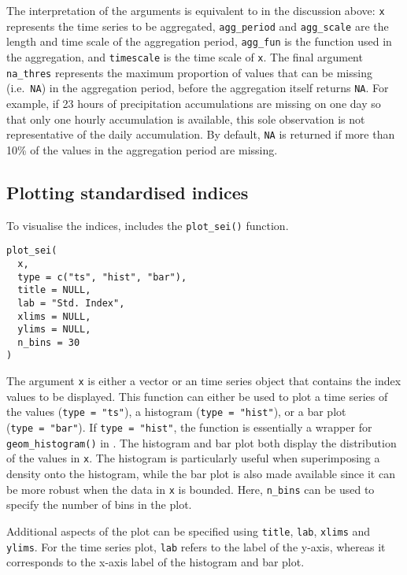 The interpretation of the arguments is equivalent to in the discussion above: \texttt{x} represents the  time series to be aggregated, \texttt{agg\_period} and \texttt{agg\_scale} are the length and time scale of the aggregation period, \texttt{agg\_fun} is the function used in the aggregation, and \texttt{timescale} is the time scale of \texttt{x}. The final argument \texttt{na\_thres} represents the maximum proportion of values that can be missing (i.e.~\texttt{NA}) in the aggregation period, before the aggregation itself returns \texttt{NA}. For example, if 23 hours of precipitation accumulations are missing on one day so that only one hourly accumulation is available, this sole observation is not representative of the daily accumulation. By default, \texttt{NA} is returned if more than 10\% of the values in the aggregation period are missing.

\subsection{Plotting standardised indices}\label{plotting-standardised-indices}

To visualise the indices,  includes the \texttt{plot\_sei()} function.

\begin{verbatim}
plot_sei(
  x,
  type = c("ts", "hist", "bar"),
  title = NULL,
  lab = "Std. Index",
  xlims = NULL,
  ylims = NULL,
  n_bins = 30
)
\end{verbatim}

The argument \texttt{x} is either a vector or an  time series object that contains the index values to be displayed. This function can either be used to plot a time series of the values (\texttt{type\ =\ "ts"}), a histogram (\texttt{type\ =\ "hist"}), or a bar plot (\texttt{type\ =\ "bar"}). If \texttt{type\ =\ "hist"}, the function is essentially a wrapper for \texttt{geom\_histogram()} in . The histogram and bar plot both display the distribution of the values in \texttt{x}. The histogram is particularly useful when superimposing a density onto the histogram, while the bar plot is also made available since it can be more robust when the data in \texttt{x} is bounded. Here, \texttt{n\_bins} can be used to specify the number of bins in the plot.

Additional aspects of the plot can be specified using \texttt{title}, \texttt{lab}, \texttt{xlims} and \texttt{ylims}. For the time series plot, \texttt{lab} refers to the label of the y-axis, whereas it corresponds to the x-axis label of the histogram and bar plot.

